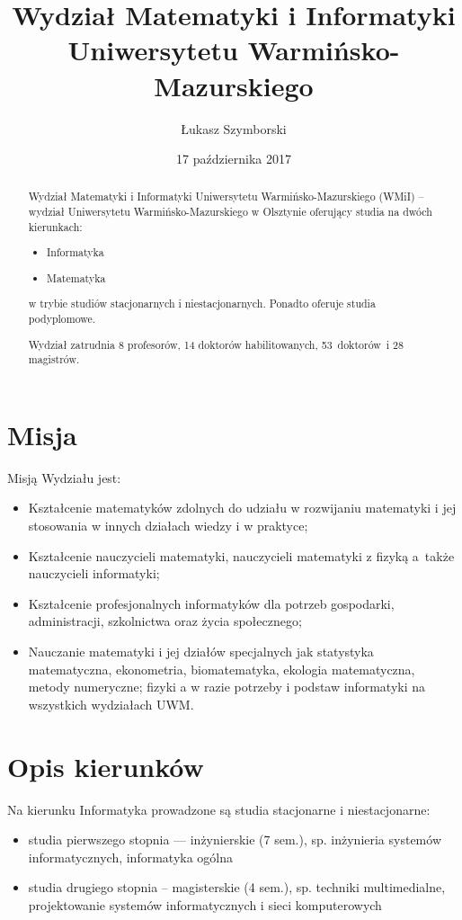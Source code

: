 ﻿\documentclass[a4paper,12pt]{article}
\title{Wydział Matematyki i Informatyki Uniwersytetu
Warmińsko-Mazurskiego}
\author{Łukasz Szymborski}
\date{17 października 2017}
\begin{document}
\maketitle

\begin{abstract}
Wydział Matematyki i Informatyki Uniwersytetu Warmińsko-Mazurskiego (WMiI) – wydział
Uniwersytetu Warmińsko-Mazurskiego w Olsztynie oferujący studia na dwóch kierunkach:

\begin{itemize}
\item Informatyka
\item Matematyka
\end{itemize}

w trybie studiów stacjonarnych i niestacjonarnych. Ponadto oferuje studia podyplomowe.

Wydział zatrudnia 8 profesorów, 14 doktorów habilitowanych, 53~doktorów~i 28 magistrów.
\end{abstract}
\tableofcontents
\section{Misja}

Misją Wydziału jest: 

\begin{itemize}
\item Kształcenie matematyków zdolnych do udziału w rozwijaniu matematyki i jej stosowania w innych działach wiedzy i w praktyce;
\item Kształcenie nauczycieli matematyki, nauczycieli matematyki z fizyką a~także nauczycieli informatyki;
\item Kształcenie profesjonalnych informatyków dla potrzeb gospodarki, administracji, szkolnictwa oraz życia społecznego; 
\item Nauczanie matematyki i jej działów specjalnych jak statystyka matematyczna, ekonometria,
biomatematyka, ekologia matematyczna, metody numeryczne; fizyki a w razie potrzeby i podstaw
informatyki na wszystkich wydziałach UWM.
\end{itemize}

\section{Opis kierunków}
Na kierunku Informatyka prowadzone są studia stacjonarne i niestacjonarne:

\begin{itemize}
\item studia pierwszego stopnia --- inżynierskie (7 sem.), sp. inżynieria systemów informatycznych, informatyka ogólna
\item studia drugiego stopnia – magisterskie (4 sem.), sp. techniki multimedialne, projektowanie systemów informatycznych i sieci komputerowych
\end{itemize}
\end{document}
